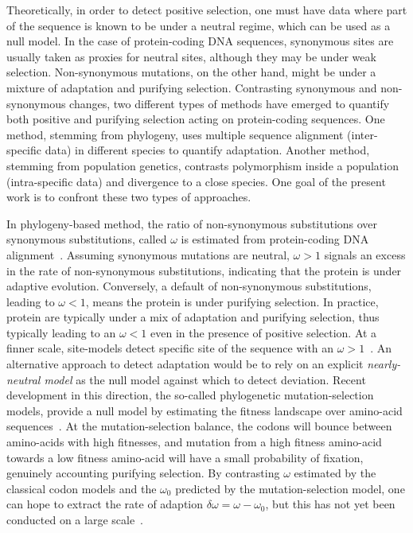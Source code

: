 \documentclass{article}
\begin{document}
Theoretically, in order to detect positive selection, one must have data where part of the sequence is known to be under a neutral regime, which can be used as a null model.
In the case of protein-coding DNA sequences, synonymous sites are usually taken as proxies for neutral sites, although they may be under weak selection.
Non-synonymous mutations, on the other hand, might be under a mixture of adaptation and purifying selection.
Contrasting synonymous and non-synonymous changes, two different types of methods have emerged to quantify both positive and purifying selection acting on protein-coding sequences.
One method, stemming from phylogeny, uses multiple sequence alignment (inter-specific data) in different species to quantify adaptation.
Another method, stemming from population genetics, contrasts polymorphism inside a population (intra-specific data) and divergence to a close species.
One goal of the present work is to confront these two types of approaches.

In phylogeny-based method, the ratio of non-synonymous substitutions over synonymous substitutions, called $\omega$ is estimated from protein-coding DNA alignment~\citep{muse_likelihood_1994,goldman_codon-based_1994}.
Assuming synonymous mutations are neutral, $\omega>1$ signals an excess in the rate of non-synonymous substitutions, indicating that the protein is under adaptive evolution.
Conversely, a default of non-synonymous substitutions, leading to $\omega<1$, means the protein is under purifying selection.
In practice, protein are typically under a mix of adaptation and purifying selection, thus typically leading to an $\omega<1$ even in the presence of positive selection.
At a finner scale, site-models detect specific site of the sequence with an $\omega>1$~\citep{yang_codon-substitution_2000, kosiol_patterns_2008}.
An alternative approach to detect adaptation would be to rely on an explicit \textit{nearly-neutral model} as the null model against which to detect deviation.
Recent development in this direction, the so-called phylogenetic mutation-selection models, provide a null model by estimating the fitness landscape over amino-acid sequences~\citep{yang_mutation-selection_2008, halpern_evolutionary_1998, rodrigue_mechanistic_2010}.
At the mutation-selection balance, the codons will bounce between amino-acids with high fitnesses, and mutation from a high fitness amino-acid towards a low fitness amino-acid will have a small probability of fixation, genuinely accounting purifying selection.
By contrasting $\omega$ estimated by the classical codon models and the $\omega_0$ predicted by the mutation-selection model, one can hope to extract the rate of adaption $\delta \omega = \omega - \omega_0$, but this has not yet been conducted on a large scale~\citep{rodrigue_detecting_2016}.
\end{document}
